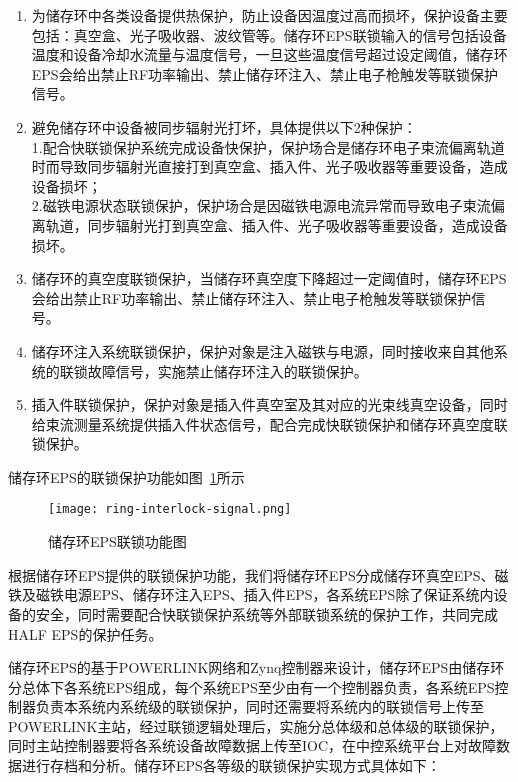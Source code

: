 \begin{enumerate}
  \item 为储存环中各类设备提供热保护，防止设备因温度过高而损坏，保护设备主要包括：真空盒、光子吸收器、波纹管等。储存环EPS联锁输入的信号包括设备温度和设备冷却水流量与温度信号，一旦这些温度信号超过设定阈值，储存环EPS会给出禁止RF功率输出、禁止储存环注入、禁止电子枪触发等联锁保护信号。

  \item 避免储存环中设备被同步辐射光打坏，具体提供以下2种保护：\\
  1.配合快联锁保护系统完成设备快保护，保护场合是储存环电子束流偏离轨道时而导致同步辐射光直接打到真空盒、插入件、光子吸收器等重要设备，造成设备损坏；\\
  2.磁铁电源状态联锁保护，保护场合是因磁铁电源电流异常而导致电子束流偏离轨道，同步辐射光打到真空盒、插入件、光子吸收器等重要设备，造成设备损坏。

  \item 储存环的真空度联锁保护，当储存环真空度下降超过一定阈值时，储存环EPS会给出禁止RF功率输出、禁止储存环注入、禁止电子枪触发等联锁保护信号。

  \item 储存环注入系统联锁保护，保护对象是注入磁铁与电源，同时接收来自其他系统的联锁故障信号，实施禁止储存环注入的联锁保护。

  \item 插入件联锁保护，保护对象是插入件真空室及其对应的光束线真空设备，同时给束流测量系统提供插入件状态信号，配合完成快联锁保护和储存环真空度联锁保护。
\end{enumerate}

储存环EPS的联锁保护功能如图~\ref{fig:ring-interlock-signal}所示

\begin{figure}[!htb]
	\centering
	\texttt{[image: ring-interlock-signal.png]}
	\caption{储存环EPS联锁功能图}
	\label{fig:ring-interlock-signal}
\end{figure}

根据储存环EPS提供的联锁保护功能，我们将储存环EPS分成储存环真空EPS、磁铁及磁铁电源EPS、储存环注入EPS、插入件EPS，各系统EPS除了保证系统内设备的安全，同时需要配合快联锁保护系统等外部联锁系统的保护工作，共同完成HALF EPS的保护任务。

储存环EPS的基于POWERLINK网络和Zynq控制器来设计，储存环EPS由储存环分总体下各系统EPS组成，每个系统EPS至少由有一个控制器负责，各系统EPS控制器负责本系统内系统级的联锁保护，同时还需要将系统内的联锁信号上传至POWERLINK主站，经过联锁逻辑处理后，实施分总体级和总体级的联锁保护，同时主站控制器要将各系统设备故障数据上传至IOC，在中控系统平台上对故障数据进行存档和分析。储存环EPS各等级的联锁保护实现方式具体如下：

